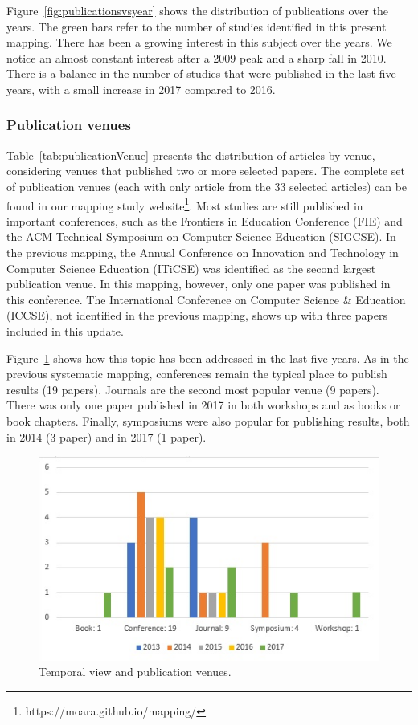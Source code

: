 Figure~\ref{fig:publicationsvsyear} shows the distribution of publications over the years. 
The green bars refer to the number of studies identified 
in this present mapping. 
There has been a growing interest in this subject over the years. We notice an almost constant interest after a 2009 peak and a sharp fall in 2010. There is a balance in the number of studies that were published in the last five years, with a small increase in 2017 compared to 2016.

\subsubsection{Publication venues}



Table~\ref{tab:publicationVenue} presents the distribution of articles by venue, considering venues that published two or more selected papers. The complete set of publication venues (each with only article from the 33 selected articles) 
can  be found in our mapping study website\footnote{https://moara.github.io/mapping/}.  Most studies are still published in important conferences, 
such as the Frontiers in Education Conference (FIE) and the ACM Technical Symposium on Computer Science Education (SIGCSE). 
In the previous mapping, the Annual Conference on Innovation and Technology in Computer Science Education (ITiCSE) was identified as the second largest publication venue. In this mapping, however, only one paper was published in this conference.
The International Conference on Computer Science \& Education (ICCSE), not
identified in the previous mapping, shows up with three papers included in this update.

Figure~\ref{fig:temporalViewpublicationsources} shows how this topic has been addressed in the last five years. As in the previous systematic mapping, conferences remain the typical place to publish results (19 papers). Journals are the second most popular venue (9 papers). There was only one paper published in 2017 in both workshops and as books or book chapters. Finally, symposiums were also popular for publishing results, both in 2014 (3 paper) and in 2017 (1 paper).

\begin{figure}[ht]
\includegraphics[width=\linewidth]{fig/types_of_venue.jpeg}
\caption{Temporal view and publication venues.} \label{fig:temporalViewpublicationsources}
\end{figure}


